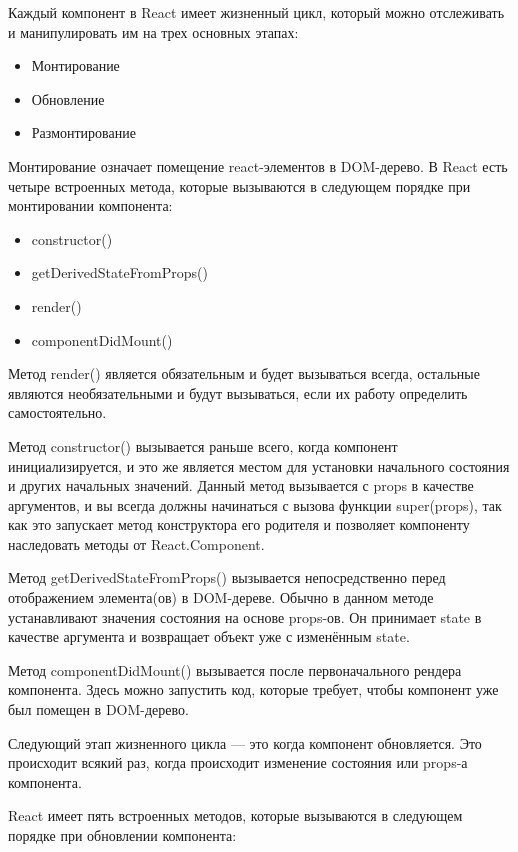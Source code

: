 \documentclass[12pt, a4paper]{diplom}
\begin{document}
Каждый компонент в React имеет жизненный цикл, который можно отслеживать и манипулировать им на трех основных этапах:

\begin{itemize}
\item Монтирование
\item Обновление
\item Размонтирование
\end{itemize}

Монтирование означает помещение react-элементов в DOM-дерево. В React есть четыре встроенных метода, которые вызываются в следующем порядке при монтировании компонента:

\begin{itemize}
  \item constructor()
  \item getDerivedStateFromProps()
  \item render()
  \item componentDidMount()
\end{itemize}

Метод render() является обязательным и будет вызываться всегда, остальные являются необязательными и будут вызываться, если их работу определить самостоятельно.

Метод constructor() вызывается раньше всего, когда компонент инициализируется, и это же является местом для установки начального состояния и других начальных значений. Данный метод вызывается с props в качестве аргументов, и вы всегда должны начинаться с вызова функции super(props), так как это запускает метод конструктора его родителя и позволяет компоненту наследовать методы от React.Component.

Метод getDerivedStateFromProps() вызывается непосредственно перед отображением элемента(ов) в DOM-дереве. Обычно в данном методе устанавливают значения состояния на основе props-ов. Он принимает state в качестве аргумента и возвращает объект уже с изменённым state.

Метод componentDidMount() вызывается после первоначального рендера компонента.
Здесь можно запустить код, которые требует, чтобы компонент уже был помещен в DOM-дерево.

Следующий этап жизненного цикла — это когда компонент обновляется.
Это происходит всякий раз, когда происходит изменение состояния или props-а компонента.

React имеет пять встроенных методов, которые вызываются в следующем порядке при обновлении компонента:
\end{document}
